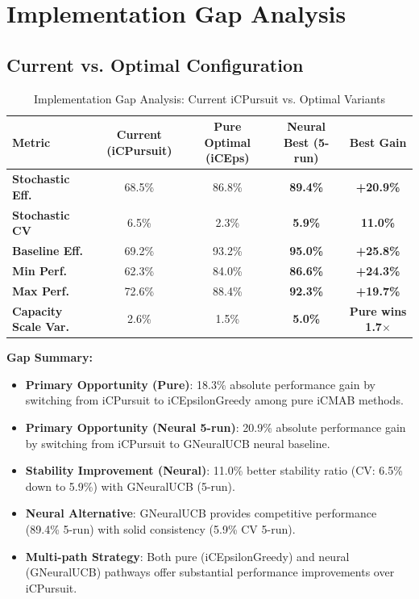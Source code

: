 \documentclass[12pt,a4paper]{article}
\newcommand{\success}[1]{\textcolor{accentgreen}{\textbf{#1}}}
\newcommand{\warning}[1]{\textcolor{warningred}{\textbf{#1}}}
\newcommand{\neural}[1]{\textcolor{neuralcolor}{\textbf{#1}}}
\begin{document}
\section{Implementation Gap Analysis}

\subsection{Current vs. Optimal Configuration}

\begin{table}[H]
\centering
\caption{Implementation Gap Analysis: Current iCPursuit vs. Optimal Variants}
\label{tab:implementation-gap}
\begin{tabular}{@{}lcccc@{}}
\toprule
\textbf{Metric} & \textbf{Current (iCPursuit)} & \textbf{Pure Optimal (iCEps)} & \textbf{Neural Best (5-run)} & \textbf{Best Gain} \\
\midrule
\warning{Stochastic Eff.} & 68.5\% & 86.8\% & \neural{89.4\%} & \neural{+20.9\%} \\
\warning{Stochastic CV} & 6.5\% & 2.3\% & \neural{5.9\%} & \neural{11.0\%} \\
\warning{Baseline Eff.} & 69.2\% & 93.2\% & \neural{95.0\%} & \neural{+25.8\%} \\
\warning{Min Perf.} & 62.3\% & 84.0\% & \neural{86.6\%} & \neural{+24.3\%} \\
\warning{Max Perf.} & 72.6\% & 88.4\% & \neural{92.3\%} & \neural{+19.7\%} \\
\midrule
\warning{Capacity Scale Var.} & 2.6\% & 1.5\% & \neural{5.0\%} & \neural{Pure wins 1.7$\times$} \\
\bottomrule
\end{tabular}
\end{table}

\textbf{Gap Summary:}
\begin{itemize}
\item \warning{Primary Opportunity (Pure)}: 18.3\% absolute performance gain by switching from iCPursuit to iCEpsilonGreedy among pure iCMAB methods.
\item \warning{Primary Opportunity (Neural 5-run)}: 20.9\% absolute performance gain by switching from iCPursuit to GNeuralUCB neural baseline.
\item \warning{Stability Improvement (Neural)}: 11.0\% better stability ratio (CV: 6.5\% down to 5.9\%) with GNeuralUCB (5-run).
\item \neural{Neural Alternative}: GNeuralUCB provides competitive performance (89.4\% 5-run) with solid consistency (5.9\% CV 5-run).
\item \success{Multi-path Strategy}: Both pure (iCEpsilonGreedy) and neural (GNeuralUCB) pathways offer substantial performance improvements over iCPursuit.
\end{itemize}
\end{document}
